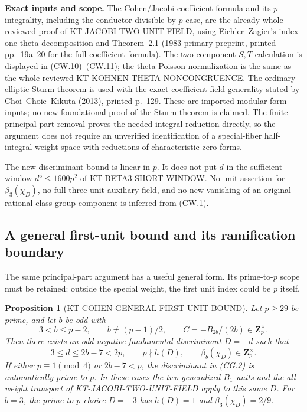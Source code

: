 \documentclass[11pt,a4paper]{article}
\newtheorem{proposition}[theorem]{Proposition}
\theoremstyle{definition}
\renewcommand{\paragraph}[1]{\par\smallskip\noindent\textbf{#1}\quad\ignorespaces}
\begin{document}
\paragraph{Exact inputs and scope.}
The Cohen/Jacobi coefficient formula and its $p$-integrality,
including the conductor-divisible-by-$p$ case, are the already
whole-reviewed proof of KT-JACOBI-TWO-UNIT-FIELD, using
Eichler--Zagier's index-one theta decomposition and Theorem~2.1
(1983 primary preprint, printed pp.~19a--20 for the full
coefficient formula).  The two-component $S,T$ calculation is
displayed in (CW.10)--(CW.11); the theta Poisson normalization is
the same as the whole-reviewed KT-KOHNEN-THETA-NONCONGRUENCE.
The ordinary elliptic Sturm theorem is used with the exact
coefficient-field generality stated by Choi--Choie--Kikuta
(2013), printed p.~129.  These are imported modular-form inputs;
no new foundational proof of the Sturm theorem is claimed.
The finite principal-part removal proves the needed integral
reduction directly, so the argument does not require an
unverified identification of a special-fiber half-integral
weight space with reductions of characteristic-zero forms.

The new discriminant bound is linear in $p$.  It does not put
$d$ in the sufficient window $d^5\leq1600p^2$ of
KT-BETA3-SHORT-WINDOW.  No unit assertion for
$\beta_3(\chi_D)$, no full three-unit auxiliary field, and
no new vanishing of an original rational class-group component
is inferred from (CW.1).



\subsection{A general first-unit bound and its ramification boundary}

The same principal-part argument has a useful general form.
Its prime-to-$p$ scope must be retained: outside the special
weight, the first unit index could be $p$ itself.

\begin{proposition}[KT-COHEN-GENERAL-FIRST-UNIT-BOUND]
Let $p\geq29$ be prime, and let $b$ be odd with
\[
 3<b\leq p-2,\qquad b\ne(p-1)/2,
 \qquad C=-B_{2b}/(2b)\in\mathbf Z_p^\times.
 \tag{CG.1}
\]
Then there exists an odd negative fundamental discriminant
$D=-d$ such that
\[
 3\leq d\leq2b-7<2p,
 \qquad p\nmid h(D),\qquad
 \beta_b(\chi_D)\in\mathbf Z_p^\times.
 \tag{CG.2}
\]
If either $p\equiv1\pmod4$ or $2b-7<p$, the discriminant
in (CG.2) is automatically prime to $p$.  In these cases
the two generalized $B_1$ units and the all-weight transport
of KT-JACOBI-TWO-UNIT-FIELD apply to this same $D$.
For $b=3$, the prime-to-$p$ choice $D=-3$ has
$h(D)=1$ and $\beta_3(\chi_D)=2/9$.
\end{proposition}
\end{document}
